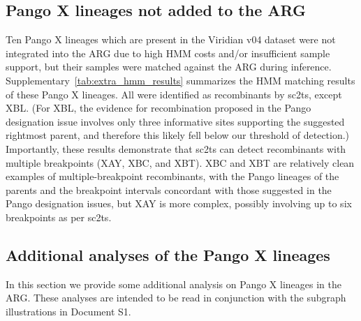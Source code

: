 \documentclass[12pt]{article}
\newcommand{\siref}[1]{Supplementary~\ref{#1}}
\begin{document}
\subsection{Pango X lineages not added to the ARG}
\label{sec:supplement_rejected_pango_x_lineages}

Ten Pango X lineages which are present in the Viridian v04 dataset
were not integrated into the ARG
due to high HMM costs and/or insufficient sample support,
but their samples were matched against the ARG during inference.
\siref{tab:extra_hmm_results} summarizes
the HMM matching results of these Pango X lineages.
All were identified as recombinants by sc2ts, except XBL.
(For XBL, the evidence for recombination
proposed in the Pango designation issue \cite{PangoIssueXBL}
involves only three informative sites
supporting the suggested rightmost parent, and
therefore this likely fell below our threshold of detection.)
Importantly, these results demonstrate that sc2ts can detect
recombinants with multiple breakpoints (XAY, XBC, and XBT).
XBC and XBT are relatively clean examples of multiple-breakpoint recombinants,
with the Pango lineages of the parents and the breakpoint intervals
concordant with those suggested in the Pango designation issues,
but XAY is more complex, possibly involving up to six breakpoints as per sc2ts.


\subsection{Additional analyses of the Pango X lineages}
\label{sec:supplement_indepth_pango_x_lineages}
In this section we provide some additional analysis on Pango X lineages
in the ARG. These analyses are intended to be read in conjunction with
the subgraph illustrations in Document S1.

\newcommand{\scghdiscussion}[1]{%
See \href{https://github.com/jeromekelleher/sc2ts-paper/discussions/#1}%
{github:sc2ts-paper/discussions/#1} for further details.}
\newcommand{\scghdiscussiontwo}[2]{%
See \href{https://github.com/jeromekelleher/sc2ts-paper/discussions/#1}%
{github:sc2ts-paper/discussions/#1} for further details on #2.}
\end{document}
